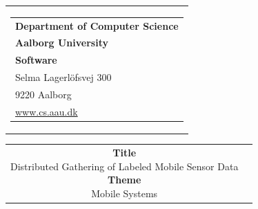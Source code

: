 


\thispagestyle{empty}

\begin{nopagebreak}
{
\samepage 
\begin{tabular}{r}
\parbox{\textwidth}
{
    \hfill \parbox{7.9cm}
    {
        \begin{tabular}{l}
            {\sf\small \textbf{Department of Computer Science}}\\
            {\sf\small \textbf{Aalborg University}}\\
            {\sf\small \textbf{Software}} \\
            {\sf\small Selma Lagerl\"{o}fsvej 300} \\
            {\sf\small 9220{  }Aalborg} \\
            {\sf\small \url{www.cs.aau.dk}}
        \end{tabular}
    }
}
\\
\end{tabular}

\begin{tabular}{cc}

    \parbox{6.5cm}
    {
        \textbf{Title} \\
        Distributed Gathering of Labeled Mobile Sensor Data\\

        \textbf{Theme} \\ 
        Mobile Systems \\

}
\end{tabular}}
\end{nopagebreak}
